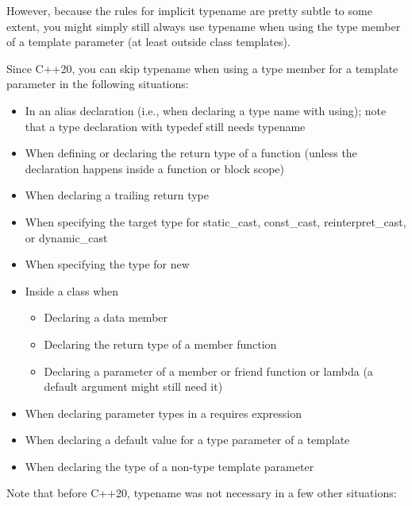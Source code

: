 However, because the rules for implicit typename are pretty subtle to some extent, you might simply still always use typename when using the type member of a template parameter (at least outside class templates).


Since C++20, you can skip typename when using a type member for a template parameter in the following situations:

\begin{itemize}
\item 
In an alias declaration (i.e., when declaring a type name with using); note that a type declaration with typedef still needs typename

\item 
When defining or declaring the return type of a function (unless the declaration happens inside a function or block scope)

\item 
When declaring a trailing return type

\item 
When specifying the target type for static\_cast, const\_cast, reinterpret\_cast, or dynamic\_cast

\item 
When specifying the type for new

\item 
Inside a class when

\begin{itemize}
\item 
Declaring a data member

\item 
Declaring the return type of a member function

\item 
Declaring a parameter of a member or friend function or lambda (a default argument might still need it)
\end{itemize}

\item 
When declaring parameter types in a requires expression

\item 
When declaring a default value for a type parameter of a template

\item 
When declaring the type of a non-type template parameter
\end{itemize}

Note that before C++20, typename was not necessary in a few other situations:

